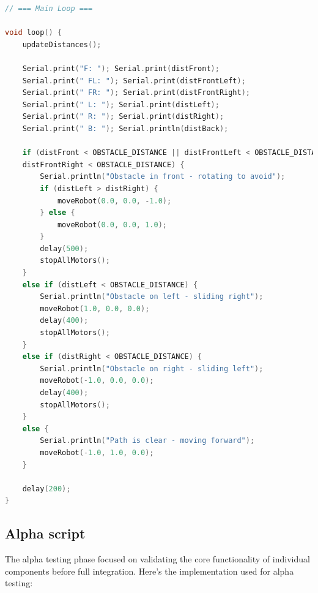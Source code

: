 \documentclass{article}
\begin{document}
\begin{lstlisting}[language=C, basicstyle=\ttfamily\footnotesize, frame=single, xleftmargin=10mm, xrightmargin=10mm]
// === Main Loop ===

void loop() {
    updateDistances();

    Serial.print("F: "); Serial.print(distFront);
    Serial.print(" FL: "); Serial.print(distFrontLeft);
    Serial.print(" FR: "); Serial.print(distFrontRight);
    Serial.print(" L: "); Serial.print(distLeft);
    Serial.print(" R: "); Serial.print(distRight);
    Serial.print(" B: "); Serial.println(distBack);

    if (distFront < OBSTACLE_DISTANCE || distFrontLeft < OBSTACLE_DISTANCE || 
    distFrontRight < OBSTACLE_DISTANCE) {
        Serial.println("Obstacle in front - rotating to avoid");
        if (distLeft > distRight) {
            moveRobot(0.0, 0.0, -1.0);
        } else {
            moveRobot(0.0, 0.0, 1.0);
        }
        delay(500);
        stopAllMotors();
    }
    else if (distLeft < OBSTACLE_DISTANCE) {
        Serial.println("Obstacle on left - sliding right");
        moveRobot(1.0, 0.0, 0.0);
        delay(400);
        stopAllMotors();
    }
    else if (distRight < OBSTACLE_DISTANCE) {
        Serial.println("Obstacle on right - sliding left");
        moveRobot(-1.0, 0.0, 0.0);
        delay(400);
        stopAllMotors();
    }
    else {
        Serial.println("Path is clear - moving forward");
        moveRobot(-1.0, 1.0, 0.0);
    }

    delay(200);
}
\end{lstlisting}

\subsection{Alpha script}
The alpha testing phase focused on validating the core functionality of individual components before full integration. Here's the implementation used for alpha testing:
\end{document}
